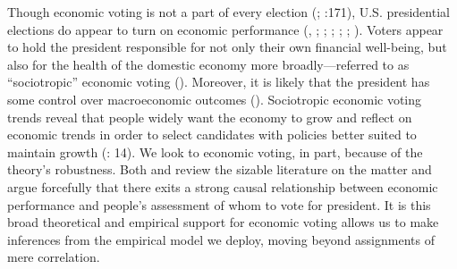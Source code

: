 \documentclass[11pt]{article}
\begin{document}
Though economic voting is not a part of every election (\citet{Stein:1990tt}; \cite{Nadeau:2001tw}:171), U.S. presidential elections do appear to turn on economic performance (\cite{miller1985throwing}, \cite{Fiorina:1978tz}; \cite{Lockerbie:1992js}; \cite{Lanoue:1994bl}; \cite{LewisBeck:2000ww}; \cite{Nadeau:2001tw}; \citet{Markus88}). Voters appear to hold the president responsible for not only their own financial well-being, but also for the health of the domestic economy more broadly---referred to as ``sociotropic'' economic voting  (\citet{Kinder1981}). Moreover, it is likely that the president has some control over macroeconomic outcomes (\cite{blinder2014presidents}).
Sociotropic economic voting trends reveal that people widely want the economy to grow and reflect on economic trends in order to select candidates with policies better suited to maintain growth (\cite{Duch2008}: 14).
We look to economic voting, in part, because of the theory's robustness. Both \cite{Duch2008} and \cite{Revisited09} review the sizable literature on the matter and argue forcefully that there exits a strong causal relationship between economic performance and people's assessment of whom to vote for president. It is this broad theoretical and empirical support for economic voting allows us to make inferences from the empirical model we deploy, moving beyond assignments of mere correlation. %
\end{document}
